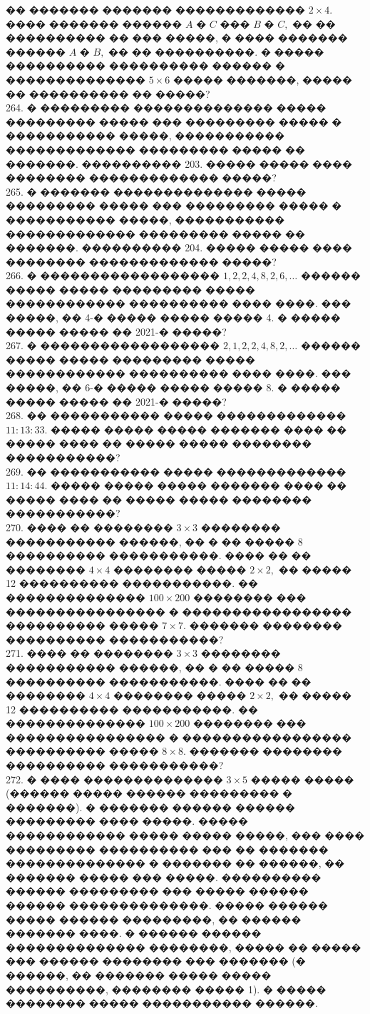 \documentclass[12pt]{article}
\begin{document}
�� ������� ������� ������������� $2\times4.$���� ������� ������ $A$ � $C$ ��� $B$ � $C,$ �� �� ���������� �� ��� �����, � ���� ������� ������ $A$ � $B,$ �� �� ����������. � ����� ���������� ���������� ������ � �������������� $5\times6$ ����� �������, ����� �� ���������� �� �����?\\
264. � ��������� �������������� ����� ��������� ����� ��� ��������� ����� � ����������� �����, ����������� ������������� ��������� ����� �� �������. ���������� 203. ����� ����� ���� �������� ������������� �����?\\
265. � ������� �������������� ����� ��������� ����� ��� ��������� ����� � ����������� �����, ����������� ������������� ��������� ����� �� �������. ���������� 204. ����� ����� ���� �������� ������������� �����?\\
266. � ������������������ $1, 2, 2, 4, 8, 2, 6, \ldots$ ������ ����� ����� ��������� ����� ������������ ���������� ���� ����. ��� �����, �� 4-� ����� ����� ����� 4. � ����� ����� ����� �� 2021-� �����?\\
267. � ������������������ $2, 1, 2, 2, 4, 8, 2, \ldots$ ������ ����� ����� ��������� ����� ������������ ���������� ���� ����. ��� �����, �� 6-� ����� ����� ����� 8. � ����� ����� ����� �� 2021-� �����?\\
268. �� ����������� ����� ������������� $11:13:33.$ ����� ����� ����� ������� ���� �� ����� ���� �� ����� ����� �������� �����������?\\
269. �� ����������� ����� ������������� $11:14:44.$ ����� ����� ����� ������� ���� �� ����� ���� �� ����� ����� �������� �����������?\\
270. ���� �� �������� $3\times3$ �������� ����������� ������, �� � �� ����� 8 ���������� �����������. ���� �� �� �������� $4\times4$ �������� ����� $2\times2,$ �� ����� 12 ���������� �����������. �� �������������� $100\times200$ �������� ��� ���������������� � ����������������� ���������� ����� $7\times7.$ ������� �������� ���������� �����������?\\
271. ���� �� �������� $3\times3$ �������� ����������� ������, �� � �� ����� 8 ���������� �����������. ���� �� �� �������� $4\times4$ �������� ����� $2\times2,$ �� ����� 12 ���������� �����������. �� �������������� $100\times200$ �������� ��� ���������������� � ����������������� ���������� ����� $8\times8.$ ������� �������� ���������� �����������?\\
272. � ���� �������������� $3\times5$ ����� ����� (������ ����� ������ ��������� � �������). � ������� ������ ������ ��������� ���� �����. ����� ������������ ����� ����� �����, ��� ���� ��������� ���������� ��� �� ������� �������������� � ������� �� ������, �� ������� ����� ��� �����. ���������� ������ ��������� ��� ����� ������ ������ ��������������. ����� ������ ����� ������ ���������, �� ������ ������� ����. � ������ ������ �������������� ��������, ����� �� ����� ��� ������ �������� ��� ������� (� ������, �� ������� ����� ����� ����������, �������� ����� 1). � ����� �������� ����� ����������� ������.
\end{document}
